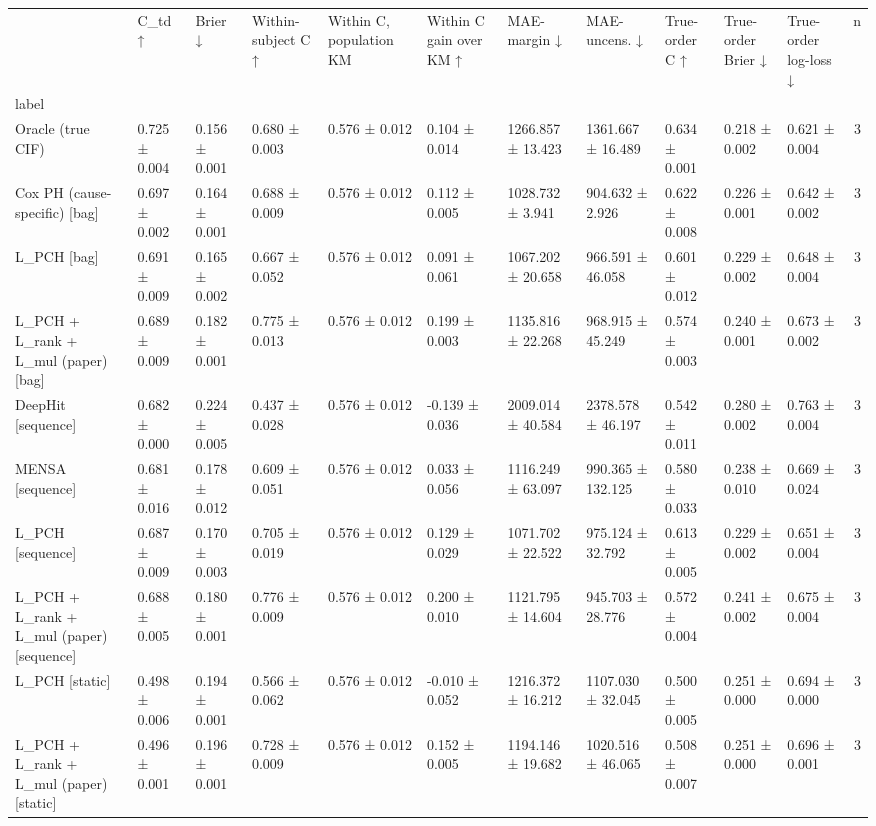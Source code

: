 \begin{tabular}{lllllllllllr}
\toprule
 & C\_td ↑ & Brier ↓ & Within-subject C ↑ & Within C, population KM & Within C gain over KM ↑ & MAE-margin ↓ & MAE-uncens. ↓ & True-order C ↑ & True-order Brier ↓ & True-order log-loss ↓ & n \\
label &  &  &  &  &  &  &  &  &  &  &  \\
\midrule
Oracle (true CIF) & 0.725 ± 0.004 & 0.156 ± 0.001 & 0.680 ± 0.003 & 0.576 ± 0.012 & 0.104 ± 0.014 & 1266.857 ± 13.423 & 1361.667 ± 16.489 & 0.634 ± 0.001 & 0.218 ± 0.002 & 0.621 ± 0.004 & 3 \\
Cox PH (cause-specific) [bag] & 0.697 ± 0.002 & 0.164 ± 0.001 & 0.688 ± 0.009 & 0.576 ± 0.012 & 0.112 ± 0.005 & 1028.732 ± 3.941 & 904.632 ± 2.926 & 0.622 ± 0.008 & 0.226 ± 0.001 & 0.642 ± 0.002 & 3 \\
L\_PCH [bag] & 0.691 ± 0.009 & 0.165 ± 0.002 & 0.667 ± 0.052 & 0.576 ± 0.012 & 0.091 ± 0.061 & 1067.202 ± 20.658 & 966.591 ± 46.058 & 0.601 ± 0.012 & 0.229 ± 0.002 & 0.648 ± 0.004 & 3 \\
L\_PCH + L\_rank + L\_mul (paper) [bag] & 0.689 ± 0.009 & 0.182 ± 0.001 & 0.775 ± 0.013 & 0.576 ± 0.012 & 0.199 ± 0.003 & 1135.816 ± 22.268 & 968.915 ± 45.249 & 0.574 ± 0.003 & 0.240 ± 0.001 & 0.673 ± 0.002 & 3 \\
DeepHit [sequence] & 0.682 ± 0.000 & 0.224 ± 0.005 & 0.437 ± 0.028 & 0.576 ± 0.012 & -0.139 ± 0.036 & 2009.014 ± 40.584 & 2378.578 ± 46.197 & 0.542 ± 0.011 & 0.280 ± 0.002 & 0.763 ± 0.004 & 3 \\
MENSA [sequence] & 0.681 ± 0.016 & 0.178 ± 0.012 & 0.609 ± 0.051 & 0.576 ± 0.012 & 0.033 ± 0.056 & 1116.249 ± 63.097 & 990.365 ± 132.125 & 0.580 ± 0.033 & 0.238 ± 0.010 & 0.669 ± 0.024 & 3 \\
L\_PCH [sequence] & 0.687 ± 0.009 & 0.170 ± 0.003 & 0.705 ± 0.019 & 0.576 ± 0.012 & 0.129 ± 0.029 & 1071.702 ± 22.522 & 975.124 ± 32.792 & 0.613 ± 0.005 & 0.229 ± 0.002 & 0.651 ± 0.004 & 3 \\
L\_PCH + L\_rank + L\_mul (paper) [sequence] & 0.688 ± 0.005 & 0.180 ± 0.001 & 0.776 ± 0.009 & 0.576 ± 0.012 & 0.200 ± 0.010 & 1121.795 ± 14.604 & 945.703 ± 28.776 & 0.572 ± 0.004 & 0.241 ± 0.002 & 0.675 ± 0.004 & 3 \\
L\_PCH [static] & 0.498 ± 0.006 & 0.194 ± 0.001 & 0.566 ± 0.062 & 0.576 ± 0.012 & -0.010 ± 0.052 & 1216.372 ± 16.212 & 1107.030 ± 32.045 & 0.500 ± 0.005 & 0.251 ± 0.000 & 0.694 ± 0.000 & 3 \\
L\_PCH + L\_rank + L\_mul (paper) [static] & 0.496 ± 0.001 & 0.196 ± 0.001 & 0.728 ± 0.009 & 0.576 ± 0.012 & 0.152 ± 0.005 & 1194.146 ± 19.682 & 1020.516 ± 46.065 & 0.508 ± 0.007 & 0.251 ± 0.000 & 0.696 ± 0.001 & 3 \\
\bottomrule
\end{tabular}
